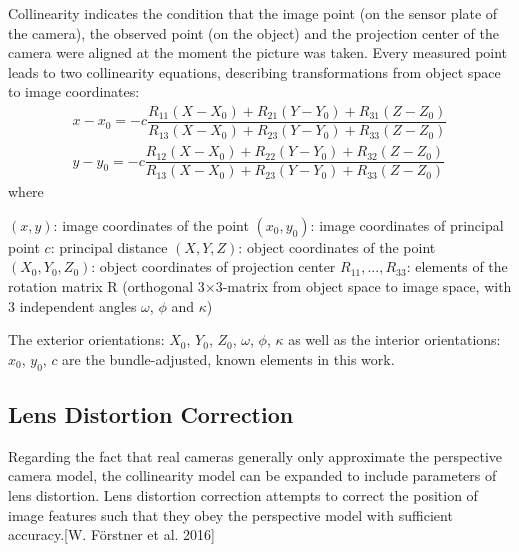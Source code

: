 Collinearity indicates the condition that the image point (on the sensor plate of the camera), the observed point (on the object) and the projection center of the camera were aligned at the moment the picture was taken. Every measured point leads to two collinearity equations, describing transformations from object space to image coordinates:
\begin{equation} %
\begin{split}
x - x_0 = -c \dfrac {R_{11}(X-X_0) + R_{21}(Y-Y_0) + R_{31}(Z-Z_0)} {R_{13}(X-X_0) + R_{23}(Y-Y_0) + R_{33}(Z-Z_0)} \\
y - y_0 = -c \dfrac {R_{12}(X-X_0) + R_{22}(Y-Y_0) + R_{32}(Z-Z_0)} {R_{13}(X-X_0) + R_{23}(Y-Y_0) + R_{33}(Z-Z_0)}
\end{split}
\end{equation}
where\newline

$(x, y)$: image coordinates of the point \newline
$(x_0, y_0)$: image coordinates of principal point \newline
$c$: principal distance \newline
$(X, Y, Z)$: object coordinates of the point \newline
$(X_0, Y_0, Z_0)$: object coordinates of projection center \newline
$R_{11},...,R_{33}$: elements of the rotation matrix R (orthogonal 3$\times$3-matrix from object space to image space, with 3 independent angles $\omega$, $\phi$ and $\kappa$)\newline

The exterior orientations: $X_0$, $Y_0$, $Z_0$, $\omega$, $\phi$, $\kappa$ as well as the interior orientations: $x_0$, $y_0$, $c$ are the bundle-adjusted, known elements in this work.

\subsection{Lens Distortion Correction}
\label{subsec:2.2.2.LensDistortion}

Regarding the fact that real cameras generally only approximate the perspective camera model, the collinearity model can be expanded to include parameters of lens distortion. Lens distortion correction attempts to correct the position of image features such that they obey the perspective model with sufficient accuracy.[W. Förstner et al. 2016] 

